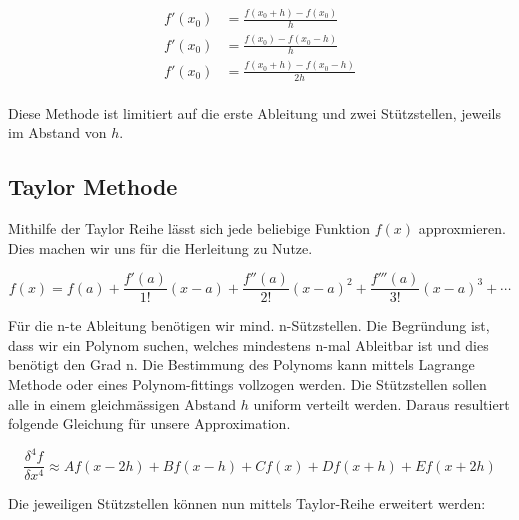 \begin{equation}
\begin{split}
f'(x_0) &= \frac{f(x_0 + h) - f(x_0)}{h} \\
f'(x_0) &= \frac{f(x_0) - f(x_0 - h)}{h} \\
f'(x_0) &= \frac{f(x_0 + h) - f(x_0 - h)}{2h} \\
\end{split}
\label{ableitung:equations:differenzenquotient}
\end{equation}




Diese Methode ist limitiert auf die erste Ableitung und zwei Stützstellen, jeweils im Abstand von $h$.

\subsection{Taylor Methode}

Mithilfe der Taylor Reihe lässt sich jede beliebige Funktion $f(x)$ approxmieren. Dies machen wir uns für die Herleitung zu Nutze.

\begin{equation}
f(x) = f(a)+{\frac {f'(a)}{1!}}(x-a)+{\frac {f''(a)}{2!}}(x-a)^{2}+{\frac {f'''(a)}{3!}}(x-a)^{3}+\cdots
\label{ableitung:eqn:taylorseries}
\end{equation}

Für die n-te Ableitung benötigen wir mind. n-Sützstellen.
Die Begründung ist, dass wir ein Polynom suchen, welches mindestens n-mal Ableitbar ist und dies benötigt den Grad n. Die Bestimmung des Polynoms kann mittels Lagrange Methode oder eines Polynom-fittings vollzogen werden.
Die Stützstellen sollen alle in einem gleichmässigen Abstand $h$ uniform verteilt werden.
Daraus resultiert folgende Gleichung für unsere Approximation.

\begin{equation}
\frac{\delta^{4} f}{\delta x^4} \approx Af(x-2h) + Bf(x-h) + Cf(x) + Df(x+h) + Ef(x+2h)
\end{equation}

Die jeweiligen Stützstellen können nun mittels Taylor-Reihe erweitert werden:

